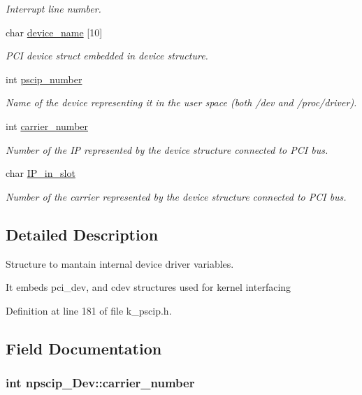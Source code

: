 \begin{CompactItemize}
\begin{CompactList}\small\item\em Interrupt line number. \item\end{CompactList}\item 
char \hyperlink{structnpscip___dev_cc7e28ef3bc0383348dc3839e0589535}{device\_\-name} \mbox{[}10\mbox{]}
\begin{CompactList}\small\item\em PCI device struct embedded in device structure. \item\end{CompactList}\item 
int \hyperlink{structnpscip___dev_d340ce8452c6d05d1c1d8755ca9d6715}{pscip\_\-number}
\begin{CompactList}\small\item\em Name of the device representing it in the user space (both /dev and /proc/driver). \item\end{CompactList}\item 
int \hyperlink{structnpscip___dev_522956db86a25d51ecf36753988184c0}{carrier\_\-number}
\begin{CompactList}\small\item\em Number of the IP represented by the device structure connected to PCI bus. \item\end{CompactList}\item 
char \hyperlink{structnpscip___dev_1cfa6d8e96fec37f835e821407e3b3f4}{IP\_\-in\_\-slot}
\begin{CompactList}\small\item\em Number of the carrier represented by the device structure connected to PCI bus. \item\end{CompactList}\end{CompactItemize}


\subsection{Detailed Description}
Structure to mantain internal device driver variables. 

It embeds pci\_\-dev, and cdev structures used for kernel interfacing 

Definition at line 181 of file k\_\-pscip.h.

\subsection{Field Documentation}
\hypertarget{structnpscip___dev_522956db86a25d51ecf36753988184c0}{
\subsubsection[{carrier\_\-number}]{\setlength{\rightskip}{0pt plus 5cm}int {\bf npscip\_\-Dev::carrier\_\-number}}}
\label{structnpscip___dev_522956db86a25d51ecf36753988184c0}


